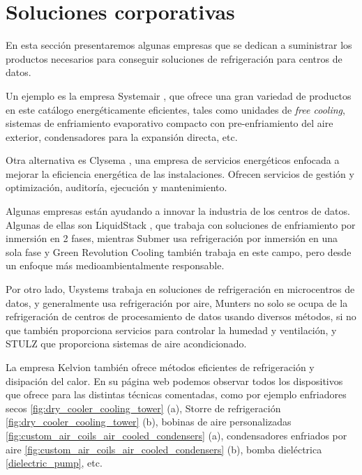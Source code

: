 \section{Soluciones corporativas} \label{empresas}

En esta sección presentaremos algunas empresas que se dedican a suministrar los productos necesarios para conseguir soluciones de refrigeración para centros de datos.

Un ejemplo es la empresa Systemair \cite{systemair}, que ofrece una gran variedad de productos en este catálogo  energéticamente eficientes, tales como unidades de \textit{free cooling}, sistemas de enfriamiento evaporativo compacto con pre-enfriamiento del aire exterior, condensadores para la expansión directa, etc.

Otra alternativa es Clysema \cite{clysema}, una empresa de servicios energéticos enfocada a mejorar la eficiencia energética de las instalaciones. Ofrecen servicios de gestión y optimización, auditoría, ejecución y mantenimiento.

Algunas empresas están ayudando a innovar la industria de los centros de datos. Algunas de ellas son LiquidStack \cite{liquidstack}, que trabaja con soluciones de enfriamiento por inmersión en 2 fases, mientras Submer \cite{submer} usa refrigeración por inmersión en una sola fase y Green Revolution Cooling \cite{GRC} también trabaja en este campo, pero desde un enfoque más medioambientalmente responsable. 

Por otro lado, Usystems \cite{usystems} trabaja en soluciones de refrigeración en microcentros de datos, y generalmente usa refrigeración por aire, Munters \cite{munters} no solo se ocupa de la refrigeración de centros de procesamiento de datos usando diversos métodos, si no que también proporciona servicios para controlar la humedad y ventilación, y STULZ \cite{stulz} que proporciona sistemas de aire acondicionado.

La empresa Kelvion \cite{Kelvion} también ofrece métodos eficientes de refrigeración y disipación del calor. En su página web podemos observar todos los dispositivos que ofrece para las distintas técnicas comentadas, como por ejemplo enfriadores secos \eqref{fig:dry_cooler_cooling_tower} (a), Storre de refrigeración \eqref{fig:dry_cooler_cooling_tower} (b), bobinas de aire personalizadas \eqref{fig:custom_air_coils_air_cooled_condensers} (a), condensadores enfriados por aire \eqref{fig:custom_air_coils_air_cooled_condensers} (b), bomba dieléctrica \eqref{dielectric_pump}, etc.

